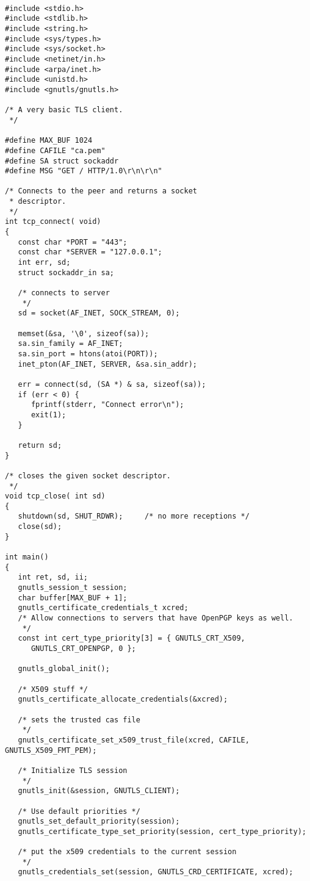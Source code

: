 \begin{verbatim}

#include <stdio.h>
#include <stdlib.h>
#include <string.h>
#include <sys/types.h>
#include <sys/socket.h>
#include <netinet/in.h>
#include <arpa/inet.h>
#include <unistd.h>
#include <gnutls/gnutls.h>

/* A very basic TLS client.
 */

#define MAX_BUF 1024
#define CAFILE "ca.pem"
#define SA struct sockaddr
#define MSG "GET / HTTP/1.0\r\n\r\n"

/* Connects to the peer and returns a socket
 * descriptor.
 */
int tcp_connect( void)
{
   const char *PORT = "443";
   const char *SERVER = "127.0.0.1";
   int err, sd;
   struct sockaddr_in sa;

   /* connects to server 
    */
   sd = socket(AF_INET, SOCK_STREAM, 0);

   memset(&sa, '\0', sizeof(sa));
   sa.sin_family = AF_INET;
   sa.sin_port = htons(atoi(PORT));
   inet_pton(AF_INET, SERVER, &sa.sin_addr);

   err = connect(sd, (SA *) & sa, sizeof(sa));
   if (err < 0) {
      fprintf(stderr, "Connect error\n");
      exit(1);
   }

   return sd;
}

/* closes the given socket descriptor.
 */
void tcp_close( int sd) 
{
   shutdown(sd, SHUT_RDWR);     /* no more receptions */
   close(sd);
}

int main()
{
   int ret, sd, ii;
   gnutls_session_t session;
   char buffer[MAX_BUF + 1];
   gnutls_certificate_credentials_t xcred;
   /* Allow connections to servers that have OpenPGP keys as well.
    */
   const int cert_type_priority[3] = { GNUTLS_CRT_X509, 
      GNUTLS_CRT_OPENPGP, 0 };

   gnutls_global_init();

   /* X509 stuff */
   gnutls_certificate_allocate_credentials(&xcred);

   /* sets the trusted cas file
    */
   gnutls_certificate_set_x509_trust_file(xcred, CAFILE, GNUTLS_X509_FMT_PEM);

   /* Initialize TLS session 
    */
   gnutls_init(&session, GNUTLS_CLIENT);

   /* Use default priorities */
   gnutls_set_default_priority(session);
   gnutls_certificate_type_set_priority(session, cert_type_priority);

   /* put the x509 credentials to the current session
    */
   gnutls_credentials_set(session, GNUTLS_CRD_CERTIFICATE, xcred);


\end{verbatim}
